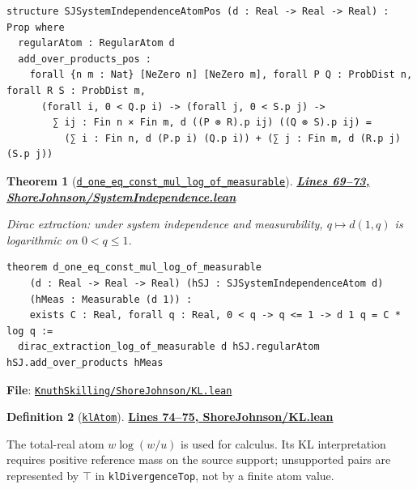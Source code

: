 \documentclass[11pt]{article}
\newtheorem{theorem}{Theorem}[section]
\theoremstyle{definition}
\newtheorem{definition}[theorem]{Definition}
\theoremstyle{remark}
\begin{document}
\begin{lstlisting}[caption={System independence with positivity hypotheses on references}]
structure SJSystemIndependenceAtomPos (d : Real -> Real -> Real) : Prop where
  regularAtom : RegularAtom d
  add_over_products_pos :
    forall {n m : Nat} [NeZero n] [NeZero m], forall P Q : ProbDist n, forall R S : ProbDist m,
      (forall i, 0 < Q.p i) -> (forall j, 0 < S.p j) ->
        ∑ ij : Fin n × Fin m, d ((P ⊗ R).p ij) ((Q ⊗ S).p ij) =
          (∑ i : Fin n, d (P.p i) (Q.p i)) + (∑ j : Fin m, d (R.p j) (S.p j))
\end{lstlisting}

\begin{theorem}[\href{https://github.com/zariuq/ks-foundations-of-inference/blob/main/KnuthSkilling/ShoreJohnson/SystemIndependence.lean\#L69}{\texttt{d\_one\_eq\_const\_mul\_log\_of\_measurable}}]
\textbf{\href{https://github.com/zariuq/ks-foundations-of-inference/blob/main/KnuthSkilling/ShoreJohnson/SystemIndependence.lean\#L69-L73}{Lines 69--73, ShoreJohnson/SystemIndependence.lean}}

Dirac extraction: under system independence and measurability, $q \mapsto d(1,q)$ is logarithmic on $0<q\le 1$.
\end{theorem}

\begin{lstlisting}[caption={Dirac extraction: Cauchy -> log under measurability}]
theorem d_one_eq_const_mul_log_of_measurable
    (d : Real -> Real -> Real) (hSJ : SJSystemIndependenceAtom d)
    (hMeas : Measurable (d 1)) :
    exists C : Real, forall q : Real, 0 < q -> q <= 1 -> d 1 q = C * log q :=
  dirac_extraction_log_of_measurable d hSJ.regularAtom hSJ.add_over_products hMeas
\end{lstlisting}

\textbf{File}: \href{https://github.com/zariuq/ks-foundations-of-inference/blob/main/KnuthSkilling/ShoreJohnson/KL.lean}{\texttt{KnuthSkilling/ShoreJohnson/KL.lean}}

\begin{definition}[\href{https://github.com/zariuq/ks-foundations-of-inference/blob/main/KnuthSkilling/ShoreJohnson/KL.lean\#L74}{\texttt{klAtom}}]
\textbf{\href{https://github.com/zariuq/ks-foundations-of-inference/blob/main/KnuthSkilling/ShoreJohnson/KL.lean\#L74-L75}{Lines 74--75, ShoreJohnson/KL.lean}}

The total-real atom $w\log(w/u)$ is used for calculus. Its KL interpretation requires positive reference mass on the source support; unsupported pairs are represented by $\top$ in \texttt{klDivergenceTop}, not by a finite atom value.
\end{definition}
\end{document}
